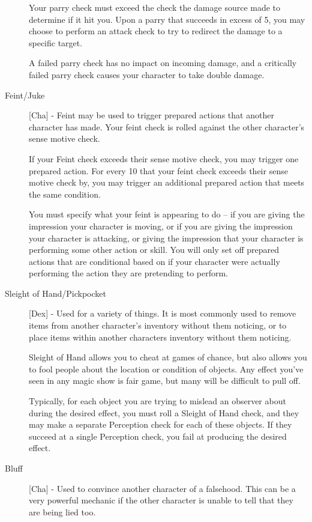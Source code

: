 \begin{description}
Your parry check must exceed the check the damage source made to determine if it hit you. Upon a parry that succeeds in excess of 5, you may choose to perform an attack check to try to redirect the damage to a specific target.

A failed parry check has no impact on incoming damage, and a critically failed parry check causes your character to take double damage.
\item[Feint/Juke] [Cha] - Feint may be used to trigger prepared actions that another character has made. Your feint check is rolled against the other character’s sense motive check.

If your Feint check exceeds their sense motive check, you may trigger one prepared action. For every 10 that your feint check exceeds their sense motive check by, you may trigger an additional prepared action that meets the same condition.

You must specify what your feint is appearing to do -- if you are giving the impression your character is moving, or if you are giving the impression your character is attacking, or giving the impression that your character is performing some other action or skill. You will only set off prepared actions that are conditional based on if your character were actually performing the action they are pretending to perform.
\item[Sleight of Hand/Pickpocket] [Dex] - Used for a variety of things. It is most commonly used to remove items from another character’s inventory without them noticing, or to place items within another characters inventory without them noticing.

Sleight of Hand allows you to cheat at games of chance, but also allows you to fool people about the location or condition of objects.
Any effect you’ve seen in any magic show is fair game, but many will be difficult to pull off.

Typically, for each object you are trying to mislead an observer about during the desired effect, you must roll a Sleight of Hand check, and they may make a separate Perception check for each of these objects. If they succeed at a single Perception check, you fail at producing the desired effect.
\item[Bluff] [Cha] - Used to convince another character of a falsehood. This can be a very powerful mechanic if the other character is unable to tell that they are being lied too.


\end{description}
